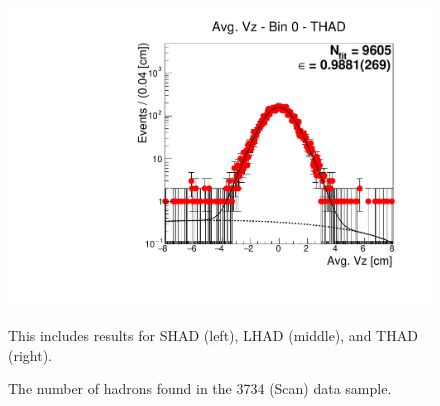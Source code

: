 \begin{figure}[H]
\includegraphics[scale=0.25]{figures/plots/nonDDbar_fit_results/scan/fit_scan_00_data_THAD.pdf}
\caption{The number of hadrons found in the 3734 (Scan) data sample.}
{This includes results for SHAD (left), LHAD (middle), and THAD (right).}
\label{fig:hadron_fits_scan_00}
\end{figure}


